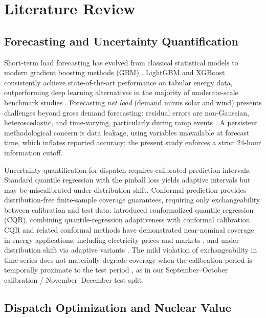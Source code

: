 \documentclass[preprint,12pt,authoryear]{elsarticle}
\begin{document}
\section{Literature Review}
\label{sec:lit}

\subsection{Forecasting and Uncertainty Quantification}

Short-term load forecasting has evolved from classical statistical models to modern gradient boosting methods (GBM) \citep{hong2016,hong2020review}. LightGBM \citep{ke2017} and XGBoost \citep{chen2016} consistently achieve state-of-the-art performance on tabular energy data, outperforming deep learning alternatives in the majority of moderate-scale benchmark studies \citep{grinsztajn2022,hertel2022}. Forecasting \emph{net load} (demand minus solar and wind) presents challenges beyond gross demand forecasting: residual errors are non-Gaussian, heteroscedastic, and time-varying, particularly during ramp events \citep{kaur2016}. A persistent methodological concern is data leakage, using variables unavailable at forecast time, which inflates reported accuracy; the present study enforces a strict 24-hour information cutoff.

Uncertainty quantification for dispatch requires calibrated prediction intervals. Standard quantile regression \citep{koenker2005} with the pinball loss \citep{gneiting2007} yields adaptive intervals but may be miscalibrated under distribution shift. Conformal prediction \citep{vovk2005} provides distribution-free finite-sample coverage guarantees, requiring only exchangeability between calibration and test data. \citet{romano2019} introduced conformalized quantile regression (CQR), combining quantile-regression adaptiveness with conformal calibration. CQR and related conformal methods have demonstrated near-nominal coverage in energy applications, including electricity prices and markets \citep{kath2021}, and under distribution shift via adaptive variants \citep{gibbs2021}. The mild violation of exchangeability in time series does not materially degrade coverage when the calibration period is temporally proximate to the test period \citep{gibbs2021}, as in our September--October calibration / November--December test split.

\subsection{Dispatch Optimization and Nuclear Value}
\end{document}
